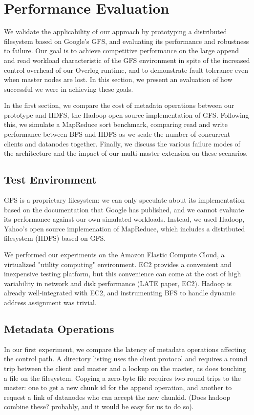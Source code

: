\documentclass{article}
\begin{document}
\section{Performance Evaluation}
\label{perf-eval}
We  validate the applicability of our approach by prototyping a distributed filesystem based on Google's GFS, and evaluating its performance and robustness to failure.  Our goal is to achieve competitive performance on the large append and read workload characteristic of the GFS environment in spite of the increased control overhead of our Overlog runtime, and to demonstrate fault tolerance even when master nodes are lost.  In this section, we present an evaluation of how successful we were in achieving these goals.

In the first section, we compare the cost of metadata operations between our prototype and HDFS, the Hadoop open source implementation of GFS.  Following this, we simulate a MapReduce sort benchmark, comparing read and write performance between BFS and HDFS as we 
scale the number of concurrent clients and datanodes together.  Finally, we discuss the various failure modes of the architecture and the impact of our multi-master extension on these scenarios.

\subsection{Test Environment}
GFS is a proprietary filesystem: we can only speculate about its implementation based on the documentation that Google has published, and we cannot evaluate its performance against our own simulated workloads.  Instead, we used Hadoop, Yahoo's open source implemenation of MapReduce, which includes a distributed filesystem (HDFS) based on GFS.

We performed our experiments on the Amazon Elastic Compute Cloud, a virtualized "utility computing" environment.  EC2 provides a convenient and inexpensive testing platform, but this convenience can come at the cost of high variability in network and disk performance (LATE paper, EC2).  Hadoop is already well-integrated with EC2, and instrumenting BFS to handle dynamic address assignment was trivial.

\subsection{Metadata Operations}
In our first experiment, we compare the latency of metadata operations affecting the control path.  A directory listing uses the client protocol and requires a round trip between the client and master and a lookup on the master, as does touching a file on the filesystem.  Copying a zero-byte file requires two round trips to the master: one to get a new chunk id for the append operation, and another to request a link of datanodes who can accept the new chunkid.  (Does hadoop combine these?  probably, and it would be easy for us to do so).
\end{document}
